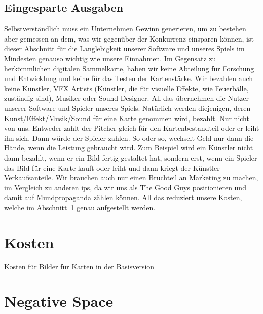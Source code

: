 \documentclass[fontsize=12, a4aper]{scrartcl}
\begin{document}

\subsection{Eingesparte Ausgaben} \label{subsec:Eingesparte_Ausgaben}

Selbstverständlich muss ein Unternehmen Gewinn generieren, um zu bestehen aber gemessen an dem, was wir gegenüber der Konkurrenz einsparen können, ist dieser Abschnitt für die Langlebigkeit unserer Software und unseres Spiels im Mindesten genauso wichtig wie unsere Einnahmen. Im Gegensatz zu herkömmlichen digitalen Sammelkarte, haben wir keine Abteilung für Forschung und Entwicklung und keine für das Testen der Kartenstärke. Wir bezahlen auch keine Künstler, VFX Artists (Künstler, die für visuelle Effekte, wie Feuerbälle, zuständig sind), Musiker oder Sound Designer. All das übernehmen die Nutzer unserer Software und Spieler unseres Spiels. Natürlich werden diejenigen, deren Kunst/Effekt/Musik/Sound für eine Karte genommen wird, bezahlt. Nur nicht von uns. Entweder zahlt der Pitcher gleich für den Kartenbestandteil oder er leiht ihn sich. Dann würde der Spieler zahlen. So oder so, wechselt Geld nur dann die Hände, wenn die Leistung gebraucht wird. Zum Beispiel wird ein Künstler nicht dann bezahlt, wenn er ein Bild fertig gestaltet hat, sondern erst, wenn ein Spieler das Bild für eine Karte kauft oder leiht und dann kriegt der Künstler Verkaufsanteile. Wir brauchen auch nur einen Bruchteil an Marketing zu machen, im Vergleich zu anderen \acp{ip}, da wir uns als \glqq The Good Guys\grqq{} positionieren und damit auf Mundpropaganda zählen können. All das reduziert unsere Kosten, welche im Abschnitt~\ref{sec:Kosten} genau aufgestellt werden.

\section{Kosten} \label{sec:Kosten}

Kosten für Bilder für Karten in der Basisversion

\section{Negative Space} \label{sec:Negativ_Space}

\end{document}
